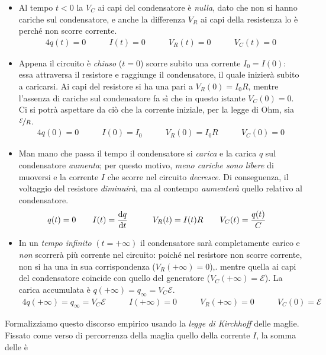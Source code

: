 \begin{itemize}
	\item Al tempo $t<0$ la \ddp $V_C$ ai capi del condensatore è \textit{nulla}, dato che non si hanno cariche sul condensatore, e anche la differenza $V_R$ ai capi della resistenza lo è perché non scorre corrente.
	\begin{alignat*}{4}
		q(t)=0 &\qquad I(t)=0 &\qquad V_R(t)=0 &\qquad V_C(t)=0
	\end{alignat*}
	\item Appena il circuito è \textit{chiuso} ($t=0$) scorre subito una corrente $I_0=I(0)$: essa attraversa il resistore e raggiunge il condensatore, il quale inizierà subito a caricarsi. Ai capi del resistore si ha una \ddp pari a $V_R(0)=I_0R$, mentre l'assenza di cariche sul condensatore fa sì che in questo istante $V_C(0)=0$. Ci si potrà aspettare da ciò che la corrente iniziale, per la legge di Ohm, sia $\nicefrac{\mathcal{E}}{R}$.
	\begin{alignat*}{4}
		q(0)=0 &\qquad I(0)=I_0 &\qquad V_R(0)=I_0R &\qquad V_C(0)=0
	\end{alignat*}
	\item Man mano che passa il tempo il condensatore si \textit{carica} e la carica $q$ sul condensatore \textit{aumenta}; per questo motivo, \textit{meno cariche sono libere} di muoversi e la corrente $I$ che scorre nel circuito \textit{decresce}. Di conseguenza, il voltaggio del resistore \textit{diminuirà}, ma al contempo \textit{aumenterà} quello relativo al condensatore.
	\begin{alignat*}{4}
		q(t)=0 &\qquad I(t)=\dv{q}{t} &\qquad V_R(t)=I(t)R &\qquad V_C(t)=\frac{q(t)}{C}
	\end{alignat*}
	\item In un \textit{tempo infinito} $(t=+\infty)$ il condensatore sarà completamente carico e \textit{non} scorrerà più corrente nel circuito: poiché nel resistore non scorre corrente, non si ha una \ddp in sua corrispondenza ($V_R(+\infty)=0$),. mentre quella ai capi del condensatore coincide con quello del generatore ($V_C(+\infty)=\mathcal{E}$). La carica accumulata è $q(+\infty)=q_{\infty}=V_C\mathcal{E}$.
	\begin{alignat*}{4}
		q(+\infty)=q_{\infty}=V_C\mathcal{E} &\qquad I(+\infty)=0 &\qquad V_R(+\infty)=0 &\qquad V_C(0)=\mathcal{E}
	\end{alignat*}
\end{itemize}
Formalizziamo questo discorso empirico usando la \textit{legge di Kirchhoff} delle maglie. Fissato come verso di percorrenza della maglia quello della corrente $I$, la somma delle \ddp è
